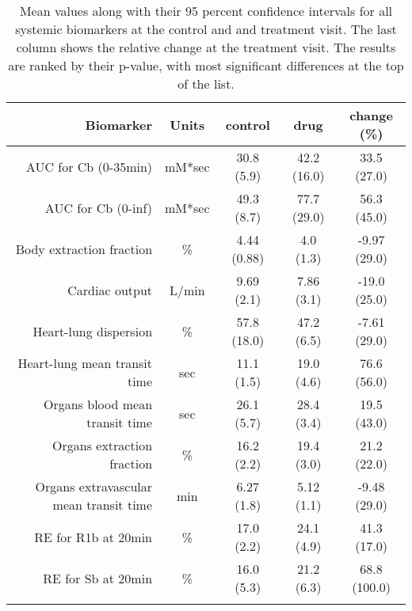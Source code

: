 \documentclass{epflreport}%
\begin{document}
\begin{longtable}{rcccc}%
\hline%
Biomarker&Units&control&drug&change (\%)\\%
\hline%
AUC for Cb (0{-}35min)&mM*sec&30.8 (5.9) &42.2 (16.0) &33.5 (27.0) \\%
AUC for Cb (0{-}inf)&mM*sec&49.3 (8.7) &77.7 (29.0) &56.3 (45.0) \\%
Body extraction fraction&\%&4.44 (0.88) &4.0 (1.3) &{-}9.97 (29.0) \\%
Cardiac output&L/min&9.69 (2.1) &7.86 (3.1) &{-}19.0 (25.0) \\%
Heart{-}lung dispersion&\%&57.8 (18.0) &47.2 (6.5) &{-}7.61 (29.0) \\%
Heart{-}lung mean transit time&sec&11.1 (1.5) &19.0 (4.6) &76.6 (56.0) \\%
Organs blood mean transit time&sec&26.1 (5.7) &28.4 (3.4) &19.5 (43.0) \\%
Organs extraction fraction&\%&16.2 (2.2) &19.4 (3.0) &21.2 (22.0) \\%
Organs extravascular mean transit time&min&6.27 (1.8) &5.12 (1.1) &{-}9.48 (29.0) \\%
RE for R1b at 20min&\%&17.0 (2.2) &24.1 (4.9) &41.3 (17.0) \\%
RE for Sb at 20min&\%&16.0 (5.3) &21.2 (6.3) &68.8 (100.0) \\%
\hline%
\caption{Mean values along with their 95 percent confidence intervals for all systemic biomarkers at the control and and treatment visit. The last column shows the relative change at the treatment visit. The results are ranked by their p-value, with most significant differences at the top of the list.} \\%
\end{longtable}%
\end{document}
